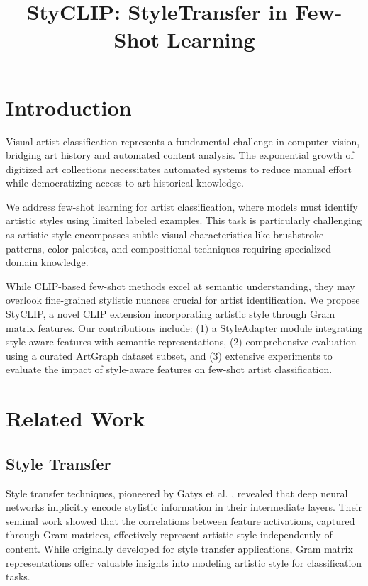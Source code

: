 \documentclass[conference,6pt]{IEEEtran}
\title{StyCLIP: StyleTransfer in Few-Shot Learning}
\author{
\IEEEauthorblockN{Emanuele Fontana}
\IEEEauthorblockA{
Università degli Studi di Bari Aldo Moro \\
Email: e.fontana7@studenti.uniba.it}
}
\begin{document}
\footnotesize 
\maketitle

\IEEEdisplaynontitleabstractindextext



\section{Introduction}

Visual artist classification represents a fundamental challenge in computer vision, bridging art history and automated content analysis. The exponential growth of digitized art collections necessitates automated systems to reduce manual effort while democratizing access to art historical knowledge.

We address few-shot learning for artist classification, where models must identify artistic styles using limited labeled examples. This task is particularly challenging as artistic style encompasses subtle visual characteristics like brushstroke patterns, color palettes, and compositional techniques requiring specialized domain knowledge.

While CLIP-based few-shot methods excel at semantic understanding, they may overlook fine-grained stylistic nuances crucial for artist identification. We propose StyCLIP, a novel CLIP extension incorporating artistic style through Gram matrix features. Our contributions include: (1) a StyleAdapter module integrating style-aware features with semantic representations, (2) comprehensive evaluation using a curated ArtGraph dataset subset, and (3) extensive experiments to evaluate the impact of style-aware features on few-shot artist classification.


\section{Related Work}

\subsection{Style Transfer}

Style transfer techniques, pioneered by Gatys et al. \cite{StyleTransfer}, revealed that deep neural networks implicitly encode stylistic information in their intermediate layers. Their seminal work showed that the correlations between feature activations, captured through Gram matrices, effectively represent artistic style independently of content. While originally developed for style transfer applications, Gram matrix representations offer valuable insights into modeling artistic style for classification tasks.
\end{document}
